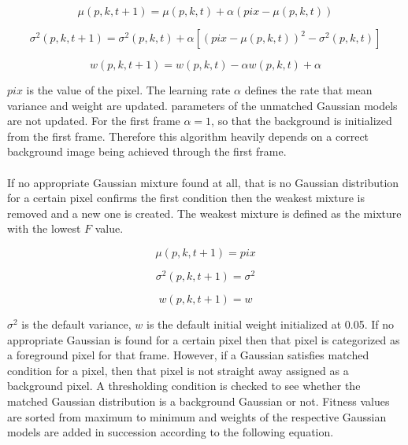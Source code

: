 \documentclass[12pt,a4paper]{report}
\begin{document}
\begin{equation}
 \mu(p,k,t+1)=  \mu(p,k,t)+ \alpha(pix- \mu(p,k,t))  
\end{equation}

\begin{equation}
\sigma^2(p,k,t+1)= \sigma^2(p,k,t)+\alpha[(pix- \mu(p,k,t))^2-\sigma^2(p,k,t)]
\end{equation}

\begin{equation}
 w(p,k,t+1)=  w(p,k,t)- \alpha w(p,k,t)+\alpha
\end{equation}

$pix$ is the value of the pixel. The learning rate $\alpha$ defines the rate that mean variance and weight are updated. parameters of the unmatched Gaussian models are not updated. For the first frame $\alpha = 1$, so that the background is initialized from the first frame.  Therefore this algorithm heavily depends on a correct background image being achieved through the first frame.\\\\
If no appropriate Gaussian mixture found at all, that is no Gaussian distribution for a certain pixel confirms the first condition then the weakest mixture is removed and a new one is created. The weakest mixture is defined as the mixture with the lowest $F$ value.

\begin{equation}
 \mu(p,k,t+1)=  pix
\end{equation}

\begin{equation}
\sigma^2(p,k,t+1)= \sigma^2
\end{equation}

\begin{equation}
 w(p,k,t+1)=w
\end{equation}

$\sigma^2$  is the default variance, $w$ is the default initial weight initialized at 0.05. If no appropriate Gaussian is found for a certain pixel then that pixel is categorized as a foreground pixel for that frame. However, if a Gaussian satisfies matched condition for a pixel, then that pixel is not straight away assigned as a background pixel. A thresholding condition is checked to see whether the matched Gaussian distribution is a background Gaussian or not. Fitness values are sorted from maximum to minimum and weights of the respective Gaussian models are added in succession according to the following equation.
\end{document}
